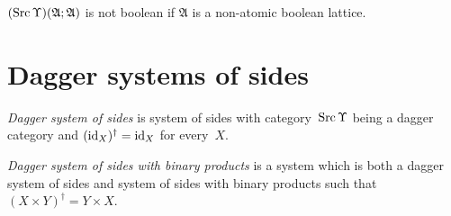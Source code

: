 \begin{cor}
  $(\operatorname{Src}\Upsilon)(\mathfrak{A}; \mathfrak{A})$ is not boolean if $\mathfrak{A}$
  is a non-atomic boolean lattice.
\end{cor}

\section{Dagger systems of sides}

\begin{defn}
\emph{Dagger system of sides} is system of sides with category~$\operatorname{Src}\Upsilon$ being a dagger category
and $(\operatorname{id}_X)^\dagger = \operatorname{id}_X$ for every~$X$.
\end{defn}

\begin{defn}
\emph{Dagger system of sides with binary products} is a system which is both a dagger system of sides and system of sides with binary products
such that $(X\times Y)^\dagger = Y\times X$.
\end{defn}